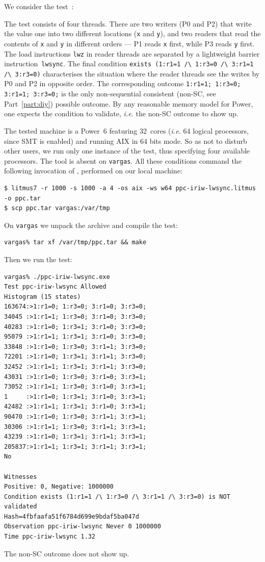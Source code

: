 We consider the test~:

The test consists of four threads.
There are  two writers (P0 and P2) that write the value
one into two different locations (\texttt{x} and \texttt{y}),
and two readers that read the contents of \texttt{x} and \texttt{y}
in different orders --- P1 reads \texttt{x} first, while P3 reads
\texttt{y} first.
The load instructions \texttt{lwz} in reader threads are separated
by a lightweight barrier instruction~\texttt{lwsync}.
The final condition \verb+exists (1:r1=1 /\ 1:r3=0 /\ 3:r1=1 /\ 3:r3=0)+
characterises the situation where the reader threads see the writes
by P0 and P2 in opposite order.
The corresponding outcome  \verb+1:r1=1; 1:r3=0; 3:r1=1; 3:r3=0;+
is the only non-sequential consistent (non-SC, see Part~\ref{part:diy}) possible outcome.
By any reasonable memory model for Power,
one expects the condition to validate,
\emph{i.e.} the non-SC outcome to show up.

The tested machine
is a Power~6 featuring 32~cores (\emph{i.e.}
64 logical processors, since SMT is enabled) and running AIX in 64 bits mode.
So as not to disturb other users, we run only one instance of the test,
thus specifying four available processors.
The \litmus{} tool is absent on \texttt{vargas}.
All these conditions command the following invocation of \litmus{},
performed on our local machine:
\begin{verbatim}
$ litmus7 -r 1000 -s 1000 -a 4 -os aix -ws w64 ppc-iriw-lwsync.litmus -o ppc.tar
$ scp ppc.tar vargas:/var/tmp
\end{verbatim}
On \texttt{vargas} we unpack the archive and compile the test:
\begin{verbatim}
vargas% tar xf /var/tmp/ppc.tar && make
\end{verbatim}
Then we run the test:
\begin{verbatim}
vargas% ./ppc-iriw-lwsync.exe
Test ppc-iriw-lwsync Allowed
Histogram (15 states)
163674:>1:r1=0; 1:r3=0; 3:r1=0; 3:r3=0;
34045 :>1:r1=1; 1:r3=0; 3:r1=0; 3:r3=0;
40283 :>1:r1=0; 1:r3=1; 3:r1=0; 3:r3=0;
95079 :>1:r1=1; 1:r3=1; 3:r1=0; 3:r3=0;
33848 :>1:r1=0; 1:r3=0; 3:r1=1; 3:r3=0;
72201 :>1:r1=0; 1:r3=1; 3:r1=1; 3:r3=0;
32452 :>1:r1=1; 1:r3=1; 3:r1=1; 3:r3=0;
43031 :>1:r1=0; 1:r3=0; 3:r1=0; 3:r3=1;
73052 :>1:r1=1; 1:r3=0; 3:r1=0; 3:r3=1;
1     :>1:r1=0; 1:r3=1; 3:r1=0; 3:r3=1;
42482 :>1:r1=1; 1:r3=1; 3:r1=0; 3:r3=1;
90470 :>1:r1=0; 1:r3=0; 3:r1=1; 3:r3=1;
30306 :>1:r1=1; 1:r3=0; 3:r1=1; 3:r3=1;
43239 :>1:r1=0; 1:r3=1; 3:r1=1; 3:r3=1;
205837:>1:r1=1; 1:r3=1; 3:r1=1; 3:r3=1;
No

Witnesses
Positive: 0, Negative: 1000000
Condition exists (1:r1=1 /\ 1:r3=0 /\ 3:r1=1 /\ 3:r3=0) is NOT validated
Hash=4fbfaafa51f6784d699e9bdaf5ba047d
Observation ppc-iriw-lwsync Never 0 1000000
Time ppc-iriw-lwsync 1.32
\end{verbatim}
The non-SC outcome does not show up.

